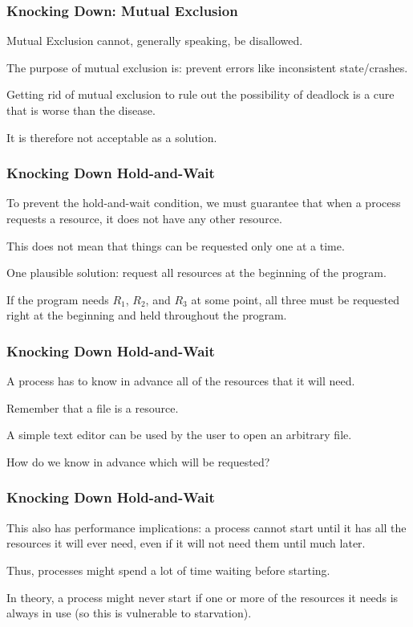 \begin{frame}
	\frametitle{Knocking Down: Mutual Exclusion}

	Mutual Exclusion cannot, generally speaking, be disallowed.

	The purpose of  mutual exclusion is: prevent errors like inconsistent state/crashes.

	Getting rid of mutual exclusion to rule out the possibility of deadlock is a cure that is worse than the disease.

	It is therefore not acceptable as a solution.


\end{frame}

\begin{frame}
	\frametitle{Knocking Down Hold-and-Wait}
	To prevent the hold-and-wait condition, we must guarantee that when a process requests a resource, it does not have any other resource.

	This does not mean that things can be requested only one at a time.

	One plausible solution: request all resources at the beginning of the program.

	If the program needs $R_{1}$, $R_{2}$, and $R_{3}$ at some point, all three must be requested right at the beginning and held throughout the program.

\end{frame}

\begin{frame}
	\frametitle{Knocking Down Hold-and-Wait}

	A process has to know in advance all of the resources that it will need.

	Remember that a file is a resource.

	A simple text editor can be used by the user to open an arbitrary file.

	How do we know in advance which will be requested?

\end{frame}

\begin{frame}
	\frametitle{Knocking Down Hold-and-Wait}

	This also has performance implications: a process cannot start until it has all the resources it will ever need, even if it will not need them until much later.

	Thus, processes might spend a lot of time waiting before starting.

	In theory, a process might never start if one or more of the resources it needs is always in use (so this is vulnerable to starvation).


\end{frame}


